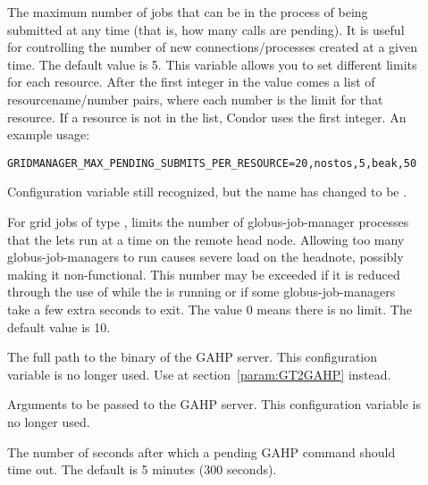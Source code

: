\begin{description}
\item[]
\label{param:GridmanagerMaxPendingSubmitsPerResource} The maximum
number of jobs
that can be in the process of being submitted at any time (that is,
how many  calls are pending).
It is useful for controlling the number of new
connections/processes created at a given time.
The default value is 5.
This variable allows
you to set different limits for each resource.
After the first integer in the value
comes a list of resourcename/number pairs,
where each number is the limit for that resource.
If a resource is not in the list,
Condor uses the first integer.
An example usage:
\begin{verbatim}
GRIDMANAGER_MAX_PENDING_SUBMITS_PER_RESOURCE=20,nostos,5,beak,50
\end{verbatim}

\item[]
\label{param:GridmanagerMaxPendingSubmits} Configuration variable
still recognized, but the name has changed to be
.

\item[]
\label{param:GridmanagerMaxJobmanagersPerResource}
For grid jobs of type , limits the number of globus-job-manager
processes that the  lets run at a time on
the remote head node. Allowing too many globus-job-managers to run
causes severe load on the headnote, possibly making it
non-functional.
This number may be exceeded if it is reduced through the use
of  while the  is running
or if some globus-job-managers take a few extra seconds to exit.
The value 0 means there is no limit. The default value is 10.

\item[]
\label{param:Gahp} The full path to the binary of the GAHP server.
This configuration variable is no longer used.
Use  at section~\ref{param:GT2GAHP} instead.

\item[]
\label{param:GahpArgs} Arguments to be passed to the GAHP server.
This configuration variable is no longer used.

\item[]
\label{param:GridmanagerGahpCallTimeout} The number of seconds after
which a pending GAHP command should time out. The default is 5 minutes
(300 seconds).


\end{description}
